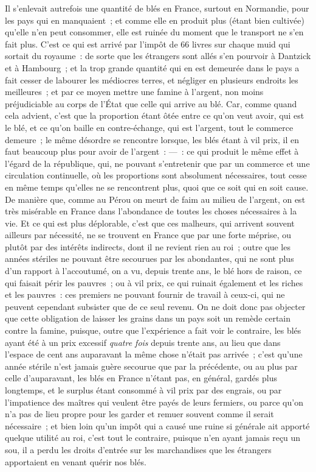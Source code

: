 \documentclass[french,twoside]{book} %
\begin{document}
\noindent Il s’enlevait autrefois une quantité de blés en France, surtout en Normandie, pour les pays qui en manquaient ; et comme elle en produit plus (étant bien cultivée) qu’elle n’en peut consommer, elle est ruinée du moment que le transport ne s’en fait plus. C’est ce qui est arrivé par l’impôt de 66 livres sur chaque muid qui sortait du royaume : de sorte que les étrangers sont allés s’en pourvoir à Dantzick et à Hambourg ; et la trop grande quantité qui en est demeurée dans le pays a fait cesser de labourer les médiocres terres, et négliger en plusieurs endroits les meilleures ; et par ce moyen mettre une famine à l’argent, non moins préjudiciable au corps de l’État que celle qui arrive au blé. Car, comme quand cela advient, c’est que la proportion étant ôtée entre ce qu’on veut avoir, qui est le blé, et ce qu’on baille en contre-échange, qui est l’argent, tout le commerce demeure ; le même désordre se rencontre lorsque, les blés étant à vil prix, il en faut beaucoup plus pour avoir de l’argent : — : ce qui produit le même effet à l’égard de la république, qui, ne pouvant s’entretenir que par un commerce et une circulation continuelle, où les proportions sont absolument nécessaires, tout cesse en même temps qu’elles ne se rencontrent plus, quoi que ce soit qui en soit cause. De manière que, comme au Pérou on meurt de faim au milieu de l’argent, on est très misérable en France dans l’abondance de toutes les choses nécessaires à la vie. Et ce qui est plus déplorable, c’est que ces malheurs, qui arrivent souvent ailleurs par nécessité, ne se trouvent en France que par une forte méprise, ou plutôt par des intérêts indirects, dont il ne revient rien au roi ; outre que les années stériles ne pouvant être secourues par les abondantes, qui ne sont plus d’un rapport à l’accoutumé, on a vu, depuis trente ans, le blé hors de raison, ce qui faisait périr les pauvres ; ou à vil prix, ce qui ruinait également et les riches et les pauvres : ces premiers ne pouvant fournir de travail à ceux-ci, qui ne peuvent cependant subsister que de ce seul revenu. On ne doit donc pas objecter que cette obligation de laisser les grains dans un pays soit un remède certain contre la famine, puisque, outre que l’expérience a fait voir le contraire, les blés ayant été à un prix excessif {\itshape quatre fois} depuis trente ans, au lieu que dans l’espace de cent ans auparavant la même chose n’était pas arrivée ; c’est qu’une année stérile n’est jamais guère secourue que par la précédente, ou au plus par celle d’auparavant, les blés en France n’étant pas, en général, gardés plus longtemps, et le surplus étant consommé à vil prix par des engrais, ou par l’impatience des maîtres qui veulent être payés de leurs fermiers, ou parce qu’on n’a pas de lieu propre pour les garder et remuer souvent comme il serait nécessaire ; et bien loin qu’un impôt qui a causé une ruine si générale ait apporté quelque utilité au roi, c’est tout le contraire, puisque n’en ayant jamais reçu un sou, il a perdu les droits d’entrée sur les marchandises que les étrangers apportaient en venant quérir nos blés.\par
\end{document}
